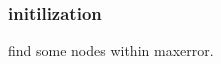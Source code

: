 \documentclass[a4paper,twoside,11pt]{article}
\theoremstyle{plain}
\theoremstyle{definition}  %
\begin{document}
\subsubsection*{initilization}
	find some nodes within maxerror.
% 
% 
% 
% 
% 
% 
\end{document}
